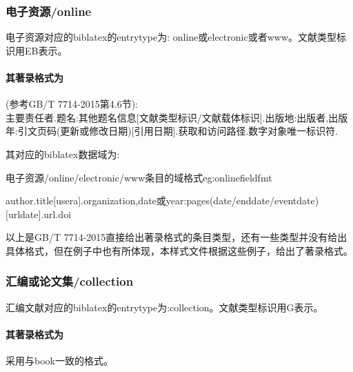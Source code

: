 \subsubsection{电子资源/online}
\begin{refentry}{}{}%
电子资源对应的biblatex的entrytype为: online或electronic或者www。文献类型标识用EB表示。

\paragraph{其著录格式为}(参考GB/T 7714-2015第4.6节):\\
主要责任者.题名:其他题名信息[文献类型标识/文献载体标识].出版地:出版者,出版年:引文页码(更新或修改日期)[引用日期].获取和访问路径.数字对象唯一标识符.
\end{refentry}

其对应的biblatex数据域为:
\begin{example}{电子资源/online/electronic/www条目的域格式}{eg:onlinefieldfmt}
\begin{texlist}
author.title[usera].organization,date或year:pages(date/enddate/eventdate)[urldate].url.doi
\end{texlist}
\end{example}


以上是GB/T 7714-2015直接给出著录格式的条目类型，还有一些类型并没有给出具体格式，但在例子中也有所体现，本样式文件根据这些例子，给出了著录格式。

\subsubsection{汇编或论文集/collection}

\begin{refentry}{}{}
汇编文献对应的biblatex的entrytype为:collection。文献类型标识用G表示。

\paragraph{其著录格式为} 采用与book一致的格式。
\end{refentry}

